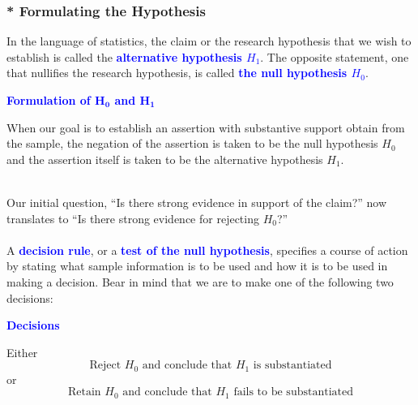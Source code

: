 \documentclass[12pt,openany]{book}
\theoremstyle{definition}
\begin{document}
	\subsubsection*{* Formulating the Hypothesis}
	In the language of statistics, the claim or the research hypothesis that we wish to establish is called the \textcolor{blue}{\bf alternative hypothesis $H_1$}. The opposite statement, one that nullifies the research hypothesis, is called \textcolor{blue}{\bf the null hypothesis $H_0$}.
	\\
	\begin{tcolorbox}[colback=white]\begin{center}
			\textcolor{blue}{\bf Formulation of $\boldsymbol{H_0}$ and $\boldsymbol{H_1}$}
		\end{center} When our goal is to establish an assertion with substantive support obtain from the sample, the negation of the assertion is taken to be the null hypothesis $H_0$ and the assertion itself is taken to be the alternative hypothesis $H_1$.
	\end{tcolorbox}\ \\
	Our initial question, ``Is there strong evidence in support of the claim?'' now
	translates to ``Is there strong evidence for rejecting $H_0$?'' \\
	\\
	A \textcolor{blue}{\bf decision rule}, or a \textcolor{blue}{\bf test of the null hypothesis}, specifies a course of action by stating what sample information is to be used and how it is to be used in
	making a decision. Bear in mind that we are to make one of the following two
	decisions:
	\begin{tcolorbox}[colback=white]\begin{center}
			\textcolor{blue}{\bf Decisions}
		\end{center} Either \[
		\text{Reject $H_0$ and conclude that $H_1$ is substantiated}
		\] or \[
		\text{Retain $H_0$ and conclude that $H_1$ fails to be substantiated}
		\]
	\end{tcolorbox}
	
\end{document}
